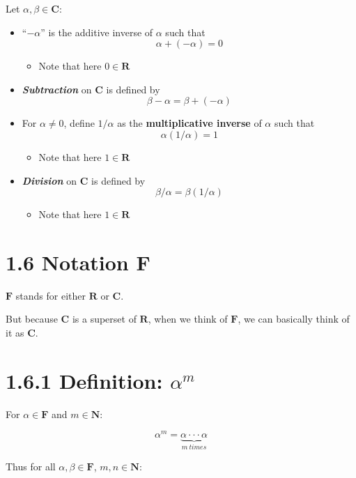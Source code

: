 \documentclass[12pt, letterpaper, oneside]{book}
\begin{document}
Let $\alpha, \beta \in \mathbf{C}$:

\begin{itemize}
  \item ``$-\alpha$'' is the additive inverse of $\alpha$ such that
    \[ \alpha + (-\alpha) = 0 \]
    \begin{itemize}
      \item Note that here $0 \in \mathbf{R}$
    \end{itemize}
  \item \textbf{\textit{Subtraction}} on $\mathbf{C}$ is defined by
    \[ \beta - \alpha = \beta + (-\alpha) \]
  \item For $\alpha \neq 0$, define $1/\alpha$ as the \textbf{multiplicative
    inverse} of $\alpha$ such that
    \[ \alpha(1/\alpha) = 1 \]
    \begin{itemize}
      \item Note that here $1 \in \mathbf{R}$
    \end{itemize}
  \item \textbf{\textit{Division}} on $\mathbf{C}$ is defined by
    \[ \beta/\alpha = \beta(1/\alpha) \]
    \begin{itemize}
      \item Note that here $1 \in \mathbf{R}$
    \end{itemize}
\end{itemize}

\section{1.6 Notation F}

$\mathbf{F}$ stands for either $\mathbf{R}$ or $\mathbf{C}$.

But because $\mathbf{C}$ is a superset of $\mathbf{R}$, when we think of
$\mathbf{F}$, we can basically think of it as $\mathbf{C}$.

\section{1.6.1 Definition: $\alpha^m$}

For $\alpha \in \mathbf{F}$ and $m \in \mathbf{N}$:

\[ \alpha^m = \underbrace{\alpha\cdot\cdot\cdot\alpha}_{m \ times} \]

Thus for all $\alpha, \beta \in \mathbf{F}$, $m, n \in \mathbf{N}$:
\end{document}
